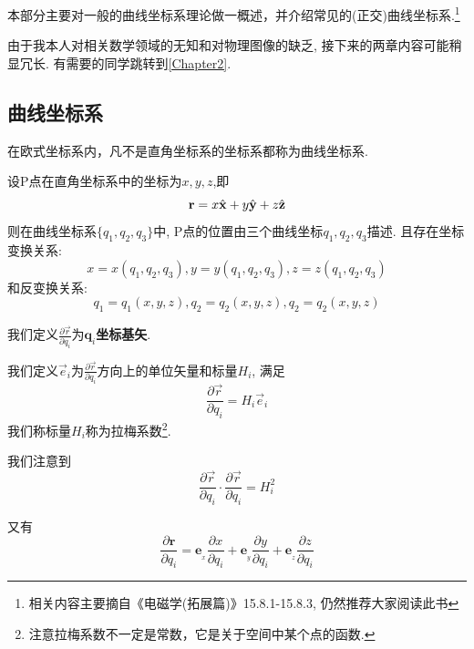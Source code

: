 本部分主要对一般的曲线坐标系理论做一概述，并介绍常见的(正交)曲线坐标系.\footnote{相关内容主要摘自《电磁学(拓展篇)》15.8.1-15.8.3, 仍然推荐大家阅读此书}

由于我本人对相关数学领域的无知和对物理图像的缺乏, 接下来的两章内容可能稍显冗长. 有需要的同学跳转到\cref{Chapter2}.

\subsection{曲线坐标系}

\begin{definition}[曲线坐标系]
    在欧式坐标系内，凡不是直角坐标系的坐标系都称为曲线坐标系.
\end{definition}

\begin{definition}[曲线坐标系的坐标]
    设P点在直角坐标系中的坐标为$x,y,z$,即
    $$
    \mathbf{r} = x\hat{\mathbf{x}}+y\hat{\mathbf{y}} +z\hat{\mathbf{z}}
    $$
    则在曲线坐标系$\{q_1,q_2,q_3\}$中, P点的位置由三个曲线坐标$q_1,q_2,q_3$描述. 且存在坐标变换关系:
    $$
    x=x(q_1,q_2,q_3),y=y(q_1,q_2,q_3),z=z(q_1,q_2,q_3)
    $$
    和反变换关系:
    $$
    q_1=q_1(x,y,z),q_2=q_2(x,y,z),q_2=q_2(x,y,z)
    $$
\end{definition}

\begin{definition}[坐标基矢]
    我们定义$\frac{\partial\vec r}{\partial q_i}$为$\boldsymbol{q}_i$\textbf{坐标基矢}.
\end{definition}

\begin{definition}[单位切矢和拉梅系数]
    我们定义$\vec e_i$为$\frac{\partial\vec r}{\partial q_i}$方向上的单位矢量和标量$H_i$, 满足
    \begin{equation}
        \frac{\partial\vec r}{\partial q_i}= H_i\vec e_i \label{eq1}
    \end{equation}
    我们称标量$H_i$称为拉梅系数\footnote{注意拉梅系数不一定是常数，它是关于空间中某个点的函数.}.
\end{definition}

我们注意到
\begin{equation}
    \frac{\partial\vec r}{\partial q_i}\cdot \frac{\partial\vec r}{\partial q_i}= H_i^2
\end{equation}

又有
\begin{equation}
    \frac{\partial \boldsymbol{r}}{\partial q_i}=\boldsymbol{e}_{_x}\frac{\partial x}{\partial q_i}+\boldsymbol{e}_{_y}\frac{\partial y}{\partial q_i}+\boldsymbol{e}_{_z}\frac{\partial z}{\partial q_i}
\end{equation}

